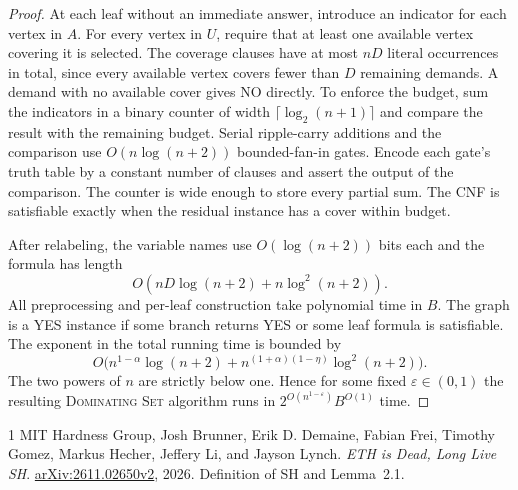 \documentclass[11pt]{article}
\begin{document}
\begin{proof}
At each leaf without an immediate answer, introduce an indicator for each vertex in $A$. For every vertex in $U$, require that at least one available vertex covering it is selected. The coverage clauses have at most $nD$ literal occurrences in total, since every available vertex covers fewer than $D$ remaining demands. A demand with no available cover gives NO directly. To enforce the budget, sum the indicators in a binary counter of width $\lceil\log_2(n+1)\rceil$ and compare the result with the remaining budget. Serial ripple-carry additions and the comparison use $O(n\log(n+2))$ bounded-fan-in gates. Encode each gate's truth table by a constant number of clauses and assert the output of the comparison. The counter is wide enough to store every partial sum. The CNF is satisfiable exactly when the residual instance has a cover within budget.

After relabeling, the variable names use $O(\log(n+2))$ bits each and the formula has length
\[
O(nD\log(n+2)+n\log^2(n+2)).
\]
All preprocessing and per-leaf construction take polynomial time in $B$. The graph is a YES instance if some branch returns YES or some leaf formula is satisfiable. The exponent in the total running time is bounded by
\[
O\bigl(n^{1-\alpha}\log(n+2)+
 n^{(1+\alpha)(1-\eta)}\log^2(n+2)\bigr).
\]
The two powers of $n$ are strictly below one. Hence for some fixed $\varepsilon\in(0,1)$ the resulting \textsc{Dominating Set} algorithm runs in $2^{O(n^{1-\varepsilon})}B^{O(1)}$ time.
\end{proof}

\begin{thebibliography}{1}
 MIT Hardness Group, Josh Brunner, Erik D. Demaine, Fabian Frei, Timothy Gomez, Markus Hecher, Jeffery Li, and Jayson Lynch.
\emph{ETH is Dead, Long Live SH}. \href{https://arxiv.org/abs/2611.02650v2}{arXiv:2611.02650v2}, 2026. Definition of SH and Lemma~2.1.
\end{thebibliography}
\end{document}

